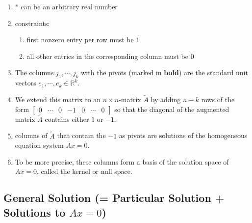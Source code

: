 \begin{enumerate}
    \item $*$ can be an arbitrary real number
    \hfill \cite{mfml/book/mml/Deisenroth-Faisal-Ong}

    \item constraints:
    \begin{enumerate}
        \item first nonzero entry per row must be $1$
        \hfill \cite{mfml/book/mml/Deisenroth-Faisal-Ong}

        \item all other entries in the corresponding column must be $0$
        \hfill \cite{mfml/book/mml/Deisenroth-Faisal-Ong}
    \end{enumerate}

    \item The columns $j_1, \cdots , j_k$ with the pivots (marked in \textbf{bold}) are the standard unit vectors $e_1, \cdots , e_k \in \mathbb{R}^k$.
    \hfill \cite{mfml/book/mml/Deisenroth-Faisal-Ong}

    \item We extend this matrix to an $n \times n$-matrix $\tilde{A}$ by adding $n - k$ rows of the form 
    $
        \begin{bmatrix}
            0 & \cdots & 0 & -1 & 0 & \cdots & 0
        \end{bmatrix}
    $
    so that the diagonal of the augmented matrix $\tilde{A}$ contains either $1$ or $-1$.
    \hfill \cite{mfml/book/mml/Deisenroth-Faisal-Ong}

    \item columns of $\tilde{A}$ that contain the $-1$ as pivots are solutions of the homogeneous equation system $Ax = 0$.
    \hfill \cite{mfml/book/mml/Deisenroth-Faisal-Ong}

    \item To be more precise, these columns form a basis of the solution space of $Ax = 0$, called the kernel or null space.
    \hfill \cite{mfml/book/mml/Deisenroth-Faisal-Ong}
\end{enumerate}





\subsection{General Solution (= Particular Solution + Solutions to $Ax=0$)}

